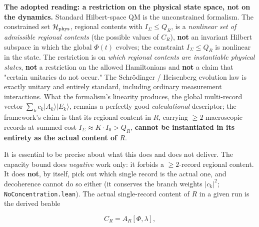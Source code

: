 \documentclass[11pt,a4paper]{article}
\begin{document}
\textbf{The adopted reading: a restriction on the physical state space, not on the dynamics.} Standard Hilbert-space QM is the unconstrained formalism. The constrained set $\mathcal{H}_{\rm phys}$, regional contents with $I_\Sigma \le Q_R$, is a \emph{nonlinear set of admissible regional contents} (the possible values of $C_R$), \textbf{not} an invariant Hilbert subspace in which the global $\Phi(t)$ evolves; the constraint $I_\Sigma \le Q_R$ is nonlinear in the state. The restriction is on \emph{which regional contents are instantiable physical states}, \textbf{not} a restriction on the allowed Hamiltonians and \textbf{not} a claim that "certain unitaries do not occur." The Schrödinger / Heisenberg evolution law is exactly unitary and entirely standard, including ordinary measurement interactions. What the formalism's linearity produces, the global multi-record vector $\sum_k c_k |A_k\rangle|E_k\rangle$, remains a perfectly good \emph{calculational} descriptor; the framework's claim is that its regional content in $R$, carrying $\ge 2$ macroscopic records at summed cost $I_\Sigma \approx K \cdot I_0 > Q_R$, \textbf{cannot be instantiated in its entirety as the actual content of $R$}.

It is essential to be precise about what this does and does not deliver. The capacity bound does \emph{negative} work only: it forbids a $\ge 2$-record regional content. It does \textbf{not}, by itself, pick out which single record is the actual one, and decoherence cannot do so either (it conserves the branch weights $|c_k|^2$; \texttt{NoConcentration.lean}). The actual single-record content of $R$ in a given run is the derived beable

\[
C_R = A_R[\Phi, \lambda],
\]
\end{document}
